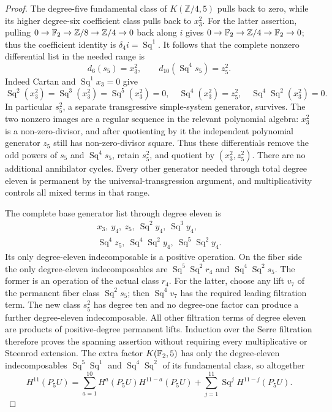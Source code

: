 \begin{proof}
The degree-five fundamental class of $K(\mathbb Z/4,5)$ pulls
back to zero, while its higher degree-six coefficient class
pulls back to $x_3^2$.  For the latter assertion, pulling
$0\to\mathbb F_2\to\mathbb Z/8\to\mathbb Z/4\to0$ back along
$i$ gives $0\to\mathbb F_2\to\mathbb Z/4\to\mathbb F_2\to0$;
thus the coefficient identity is $\delta_4i=\operatorname{Sq}^1$.
It follows that the complete nonzero differential list in the
needed range is
\[
 d_6(s_5)=x_3^2,\qquad
 d_{10}(\operatorname{Sq}^4s_5)=z_5^2.
 \tag{D.2.40k}
\]
Indeed Cartan and $\operatorname{Sq}^1x_3=0$ give
\[
 \operatorname{Sq}^2(x_3^2)=\operatorname{Sq}^3(x_3^2)
 =\operatorname{Sq}^5(x_3^2)=0,\quad
 \operatorname{Sq}^4(x_3^2)=z_5^2,\quad
 \operatorname{Sq}^4\operatorname{Sq}^2(x_3^2)=0.
 \tag{D.2.40l}
\]
In particular $s_5^2$, a separate transgressive simple-system
generator, survives.  The two nonzero images are a regular
sequence in the relevant polynomial algebra: $x_3^2$ is a
non-zero-divisor, and after quotienting by it the independent
polynomial generator $z_5$ still has non-zero-divisor square.
Thus these differentials remove the odd powers of $s_5$ and
$\operatorname{Sq}^4s_5$, retain $s_5^2$, and quotient by
$(x_3^2,z_5^2)$.  There are no additional annihilator cycles.
Every other generator needed through total degree eleven is
permanent by the universal-transgression argument, and
multiplicativity controls all mixed terms in that range.

The complete base generator list through degree eleven is
\[
\begin{gathered}
 x_3,\ y_4,\ z_5,\ \operatorname{Sq}^2y_4,\
 \operatorname{Sq}^3y_4,\\
 \operatorname{Sq}^4z_5,\
 \operatorname{Sq}^4\operatorname{Sq}^2y_4,\
 \operatorname{Sq}^5\operatorname{Sq}^2y_4.
\end{gathered}
 \tag{D.2.40m}
\]
Its only degree-eleven indecomposable is a positive operation.
On the fiber side the only degree-eleven indecomposables are
$\operatorname{Sq}^5\operatorname{Sq}^2r_4$ and
$\operatorname{Sq}^4\operatorname{Sq}^2s_5$.
The former is an operation of the actual class $r_4$.
For the latter, choose any lift $v_7$ of the permanent fiber
class $\operatorname{Sq}^2s_5$; then
$\operatorname{Sq}^4v_7$ has the required leading filtration term.
The new class $s_5^2$ has degree ten and no degree-one factor
can produce a further degree-eleven indecomposable.
All other filtration terms of degree eleven are products of
positive-degree permanent lifts.  Induction over the Serre
filtration therefore proves the spanning assertion without
requiring every multiplicative or Steenrod extension.
The extra factor $K(\mathbb F_2,5)$ has only the degree-eleven
indecomposables $\operatorname{Sq}^5\operatorname{Sq}^1$ and
$\operatorname{Sq}^4\operatorname{Sq}^2$ of its fundamental
class, so altogether
\[
 H^{11}(P_5U)=
 \sum_{a=1}^{10} H^a(P_5U)H^{11-a}(P_5U)
 +\sum_{j=1}^{11}\operatorname{Sq}^jH^{11-j}(P_5U).
 \tag{D.2.40n}
\]


\end{proof}
